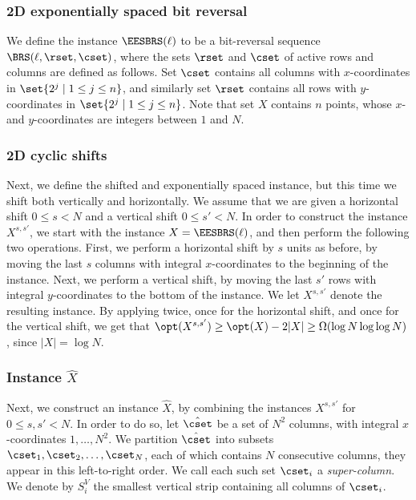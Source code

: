 \documentclass{toc}
\begin{document}
\subsubsection{2D exponentially spaced bit reversal} 

We define the instance $\EESBRS(\ell)$ to be a bit-reversal sequence $\BRS(\ell,\rset,\cset)$, where the sets $\rset$ and $\cset$ of active rows and columns are defined as follows. Set $\cset$ contains all columns with $x$-coordinates in $\set{2^j\mid 1\leq j\leq n}$, and similarly set $\rset$ contains all rows with $y$-coordinates in $\set{2^j\mid 1\leq j\leq n}$. Note that set $X$ contains $n$ points, whose $x$- and $y$-coordinates are integers between $1$ and $N$.


 

%
%
	
	
\subsubsection{2D cyclic shifts} 

Next, we define the shifted and exponentially spaced instance, but this time we shift both vertically and horizontally. 
We assume that we are given a horizontal shift $0\leq s<N$ and a vertical shift $0\leq s'<N$. 
In order to construct the instance $X^{s,s'}$, we start with the instance $X=\EESBRS(\ell)$, and then perform the following two operations. 
First, we perform a horizontal shift by $s$ units as before, by moving the last $s$ columns with integral $x$-coordinates  to the beginning of the instance. 
Next, we perform a vertical shift, by moving the last $s'$ rows with integral $y$-coordinates to the bottom of the instance. 
We let $X^{s,s'}$ denote the resulting instance. 
By applying  twice, once for the horizontal shift, and once for the vertical shift, we get that $\opt(X^{s,s'})\geq \opt(X)-2|X|\geq \Omega(\log N\log\log N)$, since $|X|=\log N$.




\subsubsection{Instance $\hat{X}$} 

Next, we construct an instance $\hat X$, by combining the instances $X^{s,s'}$ for $0\leq s,s'<N$. 
In order to do so, let $\hat \cset$ be a set of $N^2$ columns, with integral $x$-coordinates $1,\ldots,N^2$. We partition $\hat \cset$ into subsets $\cset_1, \cset_2,\ldots,\cset_N$, each of which contains $N$ consecutive columns, they appear in this left-to-right order. 
We call each such set $\cset_i$ a \emph{super-column}. We denote by $S^V_i$ the smallest vertical strip containing all columns of $\cset_i$.
\end{document}
